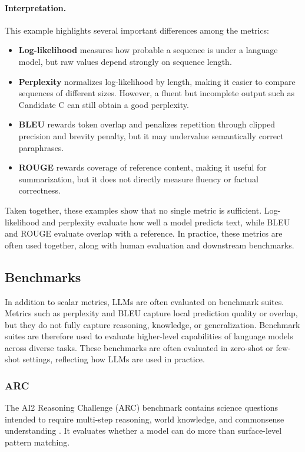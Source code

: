 \documentclass{article}
\begin{document}
\paragraph{Interpretation.}
This example highlights several important differences among the metrics:
\begin{itemize}
    \item \textbf{Log-likelihood} measures how probable a sequence is under a language model, but raw values depend strongly on sequence length.
    \item \textbf{Perplexity} normalizes log-likelihood by length, making it easier to compare sequences of different sizes. However, a fluent but incomplete output such as Candidate C can still obtain a good perplexity.
    \item \textbf{BLEU} rewards token overlap and penalizes repetition through clipped precision and brevity penalty, but it may undervalue semantically correct paraphrases.
    \item \textbf{ROUGE} rewards coverage of reference content, making it useful for summarization, but it does not directly measure fluency or factual correctness.
\end{itemize}

Taken together, these examples show that no single metric is sufficient. Log-likelihood and perplexity evaluate how well a model predicts text, while BLEU and ROUGE evaluate overlap with a reference. In practice, these metrics are often used together, along with human evaluation and downstream benchmarks.

\subsection{Benchmarks}

In addition to scalar metrics, LLMs are often evaluated on benchmark suites. Metrics such as perplexity and BLEU capture local prediction quality or overlap, but they do not fully capture reasoning, knowledge, or generalization. Benchmark suites are therefore used to evaluate higher-level capabilities of language models across diverse tasks. These benchmarks are often evaluated in zero-shot or few-shot settings, reflecting how LLMs are used in practice.

\subsubsection{ARC}
The AI2 Reasoning Challenge (ARC) benchmark contains science questions intended to require multi-step reasoning, world knowledge, and commonsense understanding \cite{clark2018arc}. It evaluates whether a model can do more than surface-level pattern matching.
\end{document}
